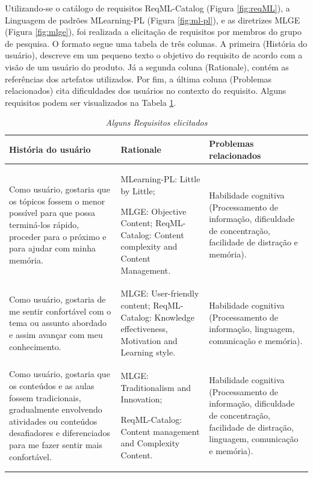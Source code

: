 Utilizando-se o catálogo de requisitos ReqML-Catalog (Figura \ref{fig:reqML}), a Linguagem de padrões MLearning-PL (Figura \ref{fig:ml-pl}), e as diretrizes MLGE (Figura \ref{fig:mlge}), foi realizada a elicitação de requisitos por membros do grupo de pesquisa. O formato segue uma tabela de três colunas. A primeira (História do usuário), descreve em um pequeno texto o objetivo do requisito de acordo com a visão de um usuário do produto. Já a segunda coluna (Rationale), contém as referências dos artefatos utilizados. Por fim, a última coluna (Problemas relacionados) cita dificuldades dos usuários no contexto do requisito. Alguns requisitos podem ser visualizados na Tabela \ref{tab:requisitos}.

\begin{table}[!ht]
\centering
\caption{\textit{Alguns Requisitos elicitados}}
\centering
\footnotesize
\begin{tabular}{p{5cm} p{5cm} p{5cm}}
\toprule
\textbf{História do usuário} & \textbf{Rationale} & \textbf{Problemas relacionados}                                   
\\ \midrule
Como usuário, gostaria que os tópicos fossem o menor possível para que possa terminá-los rápido, proceder para o próximo e para ajudar com minha memória.
& 
MLearning-PL: Little by Little;

MLGE: Objective Content; ReqML-Catalog: Content complexity and Content Management.
&
Habilidade cognitiva (Processamento de informação, dificuldade de concentração, facilidade de distração e memória).
\\ \midrule
Como usuário, gostaria de me sentir confortável com o tema ou assunto abordado e assim avançar com meu conhecimento.
& 
MLGE: User-friendly content; ReqML-Catalog: Knowledge effectiveness, Motivation and Learning style.
&
Habilidade cognitiva (Processamento de informação, linguagem, comunicação e memória).
\\ \midrule
Como usuário, gostaria que os conteúdos e as aulas fossem tradicionais, gradualmente envolvendo atividades ou conteúdos desafiadores e diferenciados para me fazer sentir mais confortável.
& 
MLGE: Traditionalism and Innovation;

ReqML-Catalog: Content management and Complexity Content.
&
Habilidade cognitiva (Processamento de informação, dificuldade de concentração, facilidade de distração, linguagem, comunicação e memória).
\\ \midrule

\end{tabular}
\label{tab:requisitos}
\end{table}

